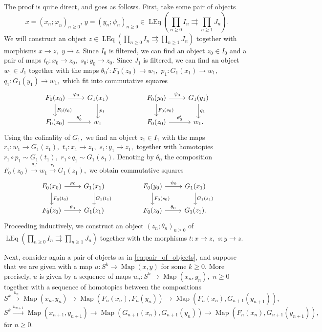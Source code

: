 \documentclass[11pt,leqno]{amsart}
\numberwithin{equation}{section}
\def\Map{\operatorname{Map}}
\newcommand{\prodd}[1][]{\mathop{\prod}\limits_{#1}}
\newcommand{\toto}{\rightrightarrows}
\newcommand{\xto}{\xrightarrow}
\newcommand{\LEq}{\operatorname{LEq}}
\begin{document}
The proof is quite direct, and goes as follows. First, take some pair of objects 
\begin{equation}\label{eq:pair_of_objects}
	x=(x_n;\varphi_n)_{n\geq 0},\,y=(y_n;\psi_n)_{n\geq 0}\in\LEq(\prodd[n\geq 0]I_n\toto\prodd[n\geq 1]J_n).
\end{equation}
We will construct an object $z\in\LEq(\prodd[n\geq 0]I_n\toto\prodd[n\geq 1]J_n)$ together with morphisms $x\to z,$ $y\to z.$ Since $I_0$ is filtered, we can find an object $z_0\in I_0$ and a pair of maps $t_0:x_0\to z_0,$ $s_0:y_0\to z_0.$ Since $J_1$ is filtered, we can find an object $w_1\in J_1$ together with the maps $\theta_0':F_0(z_0)\to w_1,$ $p_1:G_1(x_1)\to w_1,$ $q_1:G_1(y_1)\to w_1,$ which fit into commutative squares
	\begin{equation*}
		\begin{tikzcd}
			F_0(x_0) \ar[r, "\varphi_0"] \ar[d, "F_0(t_0)"] & G_1(x_1) \ar[d, "p_1"] & & F_0(y_0) \ar[r, "\psi_0"] \ar[d, "F_0(s_0)"] & G_1(y_1) \ar[d, "q_1"] \\
			F_0(z_0)\ar[r, "\theta_0'"] & w_1 & & F_0(z_0)\ar[r, "\theta_0'"] & w_1.
		\end{tikzcd}
	\end{equation*}
	Using the cofinality of $G_1,$ we find an object $z_1\in I_1$ with the maps $r_1:w_1\to G_1(z_1),$ $t_1:x_1\to z_1,$ $s_1:y_1\to z_1,$ together with homotopies $r_1\circ p_1\sim G_1(t_1),$ $r_1\circ q_1\sim G_1(s_1).$ Denoting by $\theta_0$ the composition $F_0(z_0)\xto{\theta_0'} w_1\xto{r_1} G_1(z_1),$ we obtain commutative squares
	\begin{equation*}
		\begin{tikzcd}
			F_0(x_0) \ar[r, "\varphi_0"] \ar[d, "F_0(t_0)"] & G_1(x_1) \ar[d, "G_1(t_1)"] & & F_0(y_0) \ar[r, "\psi_0"] \ar[d, "F_0(s_0)"] & G_1(x_1) \ar[d, "G_1(s_1)"] \\
			F_0(z_0)\ar[r, "\theta_0"] & G_1(z_1) & & F_0(z_0)\ar[r, "\theta_0"] & G_1(z_1).
		\end{tikzcd}
	\end{equation*}
	Proceeding inductively, we construct an object $(z_n;\theta_n)_{n\geq 0}$ of $\LEq(\prodd[n\geq 0]I_n\toto\prodd[n\geq 1]J_n)$ together with the morphisms $t:x\to z,$ $s:y\to z.$
	
	Next, consider again a pair of objects as in \eqref{eq:pair_of_objects}, and suppose that we are given with a map $u:S^k\to\Map(x,y)$ for some $k\geq 0.$ More precisely, $u$ is given by a sequence of maps $u_n:S^k\to \Map(x_n,y_n),$ $n\geq 0$ together with a sequence of homotopies between the compositions
	\begin{equation*}
		S^k\xto{u_n}\Map(x_n,y_n)\to\Map(F_n(x_n),F_n(y_n))\to\Map(F_n(x_n),G_{n+1}(y_{n+1})),
	\end{equation*} 
	\begin{equation*}
		S^k\xto{u_{n+1}}\Map(x_{n+1},y_{n+1})\to\Map(G_{n+1}(x_n),G_{n+1}(y_n))\to\Map(F_n(x_n),G_{n+1}(y_{n+1})),
	\end{equation*}
	for $n\geq 0.$
	
\end{document}

